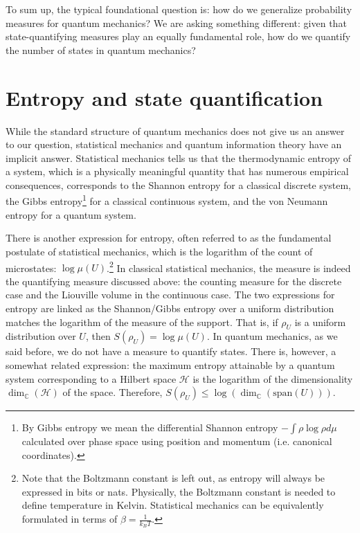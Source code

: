 \documentclass[entropy,article,submit,pdftex,moreauthors]{Definitions/mdpi}
\begin{document}
To sum up, the typical foundational question is: how do we generalize probability measures for quantum mechanics? We are asking something different: given that state-quantifying measures play an equally fundamental role, how do we quantify the number of states in quantum mechanics?

\section{Entropy and state quantification}

While the standard structure of quantum mechanics does not give us an answer to our question, statistical mechanics and quantum information theory have an implicit answer. Statistical mechanics tells us that the thermodynamic entropy of a system, which is a physically meaningful quantity that has numerous empirical consequences, corresponds to the Shannon entropy for a classical discrete system, the Gibbs entropy\footnote{By Gibbs entropy we mean the differential Shannon entropy $-\int \rho \log \rho d\mu$ calculated over phase space using position and momentum (i.e. canonical coordinates).} for a classical continuous system, and the von Neumann entropy for a quantum system.

There is another expression for entropy, often referred to as the fundamental postulate of statistical mechanics, \cite{Peliti2011} which is the logarithm of the count of microstates: $\log \mu(U)$.\footnote{Note that the Boltzmann constant is left out, as entropy will always be expressed in bits or nats. Physically, the Boltzmann constant is needed to define temperature in Kelvin. Statistical mechanics can be equivalently formulated in terms of $\beta = \frac{1}{k_B T}$.\cite{chyla2011evolution}} In classical statistical mechanics, the measure is indeed the quantifying measure discussed above: the counting measure for the discrete case and the Liouville volume in the continuous case. The two expressions for entropy are linked as the Shannon/Gibbs entropy over a uniform distribution matches the logarithm of the measure of the support. That is, if $\rho_U$ is a uniform distribution over $U$, then $S(\rho_U) = \log \mu(U)$. In quantum mechanics, as we said before, we do not have a measure to quantify states. There is, however, a somewhat related expression: the maximum entropy attainable by a quantum system corresponding to a Hilbert space $\mathcal{H}$ is the logarithm of the dimensionality $\dim_{\mathbb{C}}(\mathcal{H})$ of the space. Therefore, $ S(\rho_U) \leq \log (\dim_{\mathbb{C}}(\text{span}(U)))$.
\end{document}
